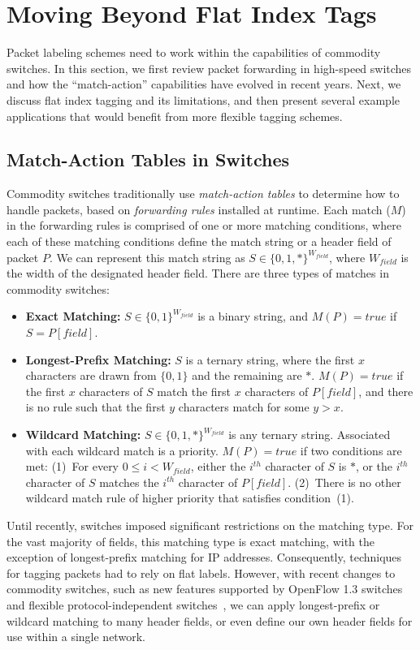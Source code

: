 \section{Moving Beyond Flat Index Tags} \label{sec:background}
Packet labeling schemes need to work within the capabilities of commodity
switches. In this section, we first review packet forwarding in high-speed
switches and how the ``match-action'' capabilities have evolved in recent years.
Next, we discuss flat index tagging and its limitations, and then present
several example applications that would benefit from more flexible tagging
schemes.

\subsection{Match-Action Tables in Switches} 
\label{ssec:match-action}
Commodity switches traditionally
use \emph{match-action tables} to determine how to handle packets, based on
\textit{forwarding rules} installed at runtime. Each match ($M$) in the forwarding
rules is comprised of one or more matching conditions, where each of these 
matching conditions define the match string or a header field of packet $P$. 
We can represent this match string as $S \in \{0,1,*\}^{W_{field}}$, where
$W_{field}$ is the width of the designated header field. There are three types 
of matches in commodity switches:

\begin{itemize} 
\item \textbf{Exact Matching:} $S \in \{0,1\}^{W_{field}}$ is a
binary string, and $M(P) = true$ if $S = P[field]$.

\item \textbf{Longest-Prefix Matching:} $S$ is a ternary string, where the first $x$
characters are drawn from $\{0,1\}$ and the remaining are $*$. $M(P) = true$ if
the first $x$ characters of $S$ match the first $x$ characters of $P[field]$,
and there is no rule such that the first $y$ characters match for some $y > x$. 

\item \textbf{Wildcard Matching:} $S \in \{0,1,*\}^{W_{field}}$ is any
ternary string. Associated with each wildcard match is a priority. $M(P) = true$
if two conditions are met: (1)~For every $0 \le i < W_{field}$, either the
$i^{th}$ character of $S$ is $*$, or the $i^{th}$ character of $S$ matches
the $i^{th}$ character of $P[field]$. (2)~There is no other wildcard match
rule of higher priority that satisfies condition~(1).  
\end{itemize}
\noindent
Until recently, switches imposed significant restrictions on the matching type.
For the vast majority of fields, this matching type is exact matching, with the
exception of longest-prefix matching for IP addresses. Consequently, techniques
for tagging packets had to rely on flat labels.  However, with recent changes to
commodity switches, such as new features supported by OpenFlow 1.3
switches~\cite{of13} and flexible protocol-independent switches~\cite{P4},
we can apply longest-prefix or wildcard matching to many header fields, or
even define our own header fields for use within a single network.

